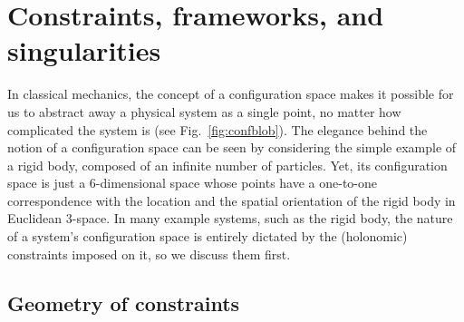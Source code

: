 
\chapter[Constraints, frameworks, and singularities]{Constraints, frameworks, and singularities}
  \label{chap02}


In classical mechanics, the concept of a configuration space makes it possible for us to abstract away a physical system as a single point, no matter how complicated the system is (see Fig.~\ref{fig:confblob}).
The elegance behind the notion of a configuration space can be seen by considering the simple example of a rigid body, composed of an infinite number of particles.
Yet, its configuration space is just a 6-dimensional space whose points have a one-to-one correspondence with the location and the spatial orientation of the rigid body in Euclidean 3-space.
In many example systems, such as the rigid body, the nature of a system's configuration space is entirely dictated by the (holonomic) constraints imposed on it, so we discuss them first.

\section{Geometry of constraints}
\label{sec:constraints}

